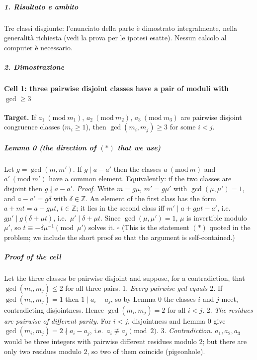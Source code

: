\documentclass[11pt,a4paper]{article}
\begin{document}
\subparagraph{1. Risultato e ambito}\label{risultato-e-ambito}

Tre classi disgiunte: l'enunciato della parte è dimostrato
integralmente, nella generalità richiesta (vedi la prova per le ipotesi
esatte). Nessun calcolo al computer è necessario.

\subparagraph{2. Dimostrazione}\label{dimostrazione}

\paragraph{\texorpdfstring{Cell 1: three pairwise disjoint classes have
a pair of moduli with
\(\gcd\ge3\)}{Cell 1: three pairwise disjoint classes have a pair of moduli with \textbackslash gcd\textbackslash ge3}}\label{cell-1-three-pairwise-disjoint-classes-have-a-pair-of-moduli-with-gcdge3}

\textbf{Target.} If \(a_1\ (\mathrm{mod}\ m_1)\),
\(a_2\ (\mathrm{mod}\ m_2)\), \(a_3\ (\mathrm{mod}\ m_3)\) are pairwise
disjoint congruence classes (\(m_i\ge1\)), then \(\gcd(m_i,m_j)\ge3\)
for some \(i<j\).

\subparagraph{\texorpdfstring{Lemma 0 (the direction of \((*)\) that we
use)}{Lemma 0 (the direction of (*) that we use)}}\label{lemma-0-the-direction-of-that-we-use}

Let \(g=\gcd(m,m')\). If \(g\mid a-a'\) then the classes
\(a\ (\mathrm{mod}\ m)\) and \(a'\ (\mathrm{mod}\ m')\) have a common
element. Equivalently: if the two classes are disjoint then
\(g\nmid a-a'\). \emph{Proof.} Write \(m=g\mu\), \(m'=g\mu'\) with
\(\gcd(\mu,\mu')=1\), and \(a-a'=g\delta\) with \(\delta\in\mathbb Z\).
An element of the first class has the form \(a+mt=a+g\mu t\),
\(t\in\mathbb Z\); it lies in the second class iff
\(m'\mid a+g\mu t-a'\), i.e.~\(g\mu'\mid g(\delta+\mu t)\),
i.e.~\(\mu'\mid\delta+\mu t\). Since \(\gcd(\mu,\mu')=1\), \(\mu\) is
invertible modulo \(\mu'\), so \(t\equiv-\delta\mu^{-1}\pmod{\mu'}\)
solves it. \(\square\) (This is the statement \((*)\) quoted in the
problem; we include the short proof so that the argument is
self-contained.)

\subparagraph{Proof of the cell}\label{proof-of-the-cell}

Let the three classes be pairwise disjoint and suppose, for a
contradiction, that \(\gcd(m_i,m_j)\le2\) for all three pairs. 1.
\emph{Every pairwise gcd equals \(2\).} If \(\gcd(m_i,m_j)=1\) then
\(1\mid a_i-a_j\), so by Lemma 0 the classes \(i\) and \(j\) meet,
contradicting disjointness. Hence \(\gcd(m_i,m_j)=2\) for all \(i<j\).
2. \emph{The residues are pairwise of different parity.} For \(i<j\),
disjointness and Lemma 0 give \(\gcd(m_i,m_j)=2\nmid a_i-a_j\),
i.e.~\(a_i\not\equiv a_j\pmod 2\). 3. \emph{Contradiction.}
\(a_1,a_2,a_3\) would be three integers with pairwise different residues
modulo \(2\); but there are only two residues modulo \(2\), so two of
them coincide (pigeonhole).
\end{document}

